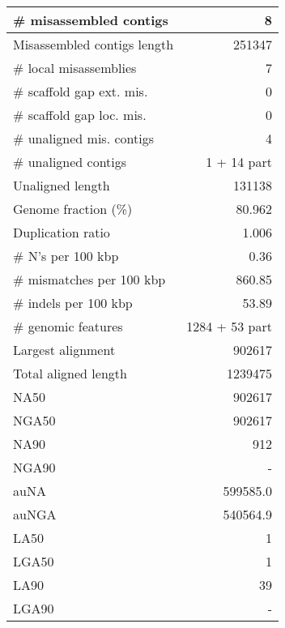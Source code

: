 \documentclass[12pt,a4paper]{article}
\begin{document}
\begin{table}[ht]
\begin{center}
\begin{tabular}{|l*{1}{|r}|}
\# misassembled contigs & 8 \\ \hline
Misassembled contigs length & 251347 \\ \hline
\# local misassemblies & 7 \\ \hline
\# scaffold gap ext. mis. & 0 \\ \hline
\# scaffold gap loc. mis. & 0 \\ \hline
\# unaligned mis. contigs & 4 \\ \hline
\# unaligned contigs & 1 + 14 part \\ \hline
Unaligned length & 131138 \\ \hline
Genome fraction (\%) & 80.962 \\ \hline
Duplication ratio & 1.006 \\ \hline
\# N's per 100 kbp & 0.36 \\ \hline
\# mismatches per 100 kbp & 860.85 \\ \hline
\# indels per 100 kbp & 53.89 \\ \hline
\# genomic features & 1284 + 53 part \\ \hline
Largest alignment & 902617 \\ \hline
Total aligned length & 1239475 \\ \hline
NA50 & 902617 \\ \hline
NGA50 & 902617 \\ \hline
NA90 & 912 \\ \hline
NGA90 & - \\ \hline
auNA & 599585.0 \\ \hline
auNGA & 540564.9 \\ \hline
LA50 & 1 \\ \hline
LGA50 & 1 \\ \hline
LA90 & 39 \\ \hline
LGA90 & - \\ \hline
\end{tabular}
\end{center}
\end{table}
\end{document}
